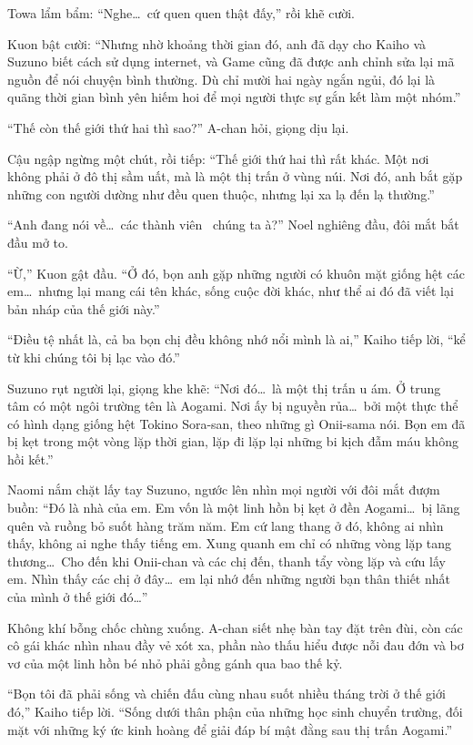 \documentclass[../main.tex]{subfiles}
\begin{document}
Towa lẩm bẩm: ``Nghe\dots\ cứ quen quen thật đấy,'' rồi khẽ cười.

Kuon bật cười: ``Nhưng nhờ khoảng thời gian đó, anh đã dạy cho Kaiho và Suzuno biết cách sử dụng internet, và Game cũng đã được anh chỉnh sửa lại mã nguồn để nói chuyện bình thường. Dù chỉ mười hai ngày ngắn ngủi, đó lại là quãng thời gian bình yên hiếm hoi để mọi người thực sự gắn kết làm một nhóm.''

``Thế còn thế giới thứ hai thì sao?'' A-chan hỏi, giọng dịu lại.

Cậu ngập ngừng một chút, rồi tiếp: ``Thế giới thứ hai thì rất khác. Một nơi không phải ở đô thị sầm uất, mà là một thị trấn ở vùng núi. Nơi đó, anh bắt gặp những con người dường như đều quen thuộc, nhưng lại xa lạ đến lạ thường.''

``Anh đang nói về\dots\ các thành viên \hll\ chúng ta à?'' Noel nghiêng đầu, đôi mắt bắt đầu mở to.

``Ừ,'' Kuon gật đầu. ``Ở đó, bọn anh gặp những người có khuôn mặt giống hệt các em\dots\ nhưng lại mang cái tên khác, sống cuộc đời khác, như thể ai đó đã viết lại bản nháp của thế giới này.''

``Điều tệ nhất là, cả ba bọn chị đều không nhớ nổi mình là ai,'' Kaiho tiếp lời, ``kể từ khi chúng tôi bị lạc vào đó.''

Suzuno rụt người lại, giọng khe khẽ: ``Nơi đó\dots\ là một thị trấn u ám. Ở trung tâm có một ngôi trường tên là Aogami. Nơi ấy bị nguyền rủa\dots\ bởi một thực thể có hình dạng giống hệt Tokino Sora-san, theo những gì Onii-sama nói. Bọn em đã bị kẹt trong một vòng lặp thời gian, lặp đi lặp lại những bi kịch đẫm máu không hồi kết.''

Naomi nắm chặt lấy tay Suzuno, ngước lên nhìn mọi người với đôi mắt đượm buồn: ``Đó là nhà của em. Em vốn là một linh hồn bị kẹt ở đền Aogami\dots\ bị lãng quên và ruồng bỏ suốt hàng trăm năm. Em cứ lang thang ở đó, không ai nhìn thấy, không ai nghe thấy tiếng em. Xung quanh em chỉ có những vòng lặp tang thương\dots\ Cho đến khi Onii-chan và các chị đến, thanh tẩy vòng lặp và cứu lấy em. Nhìn thấy các chị ở đây\dots\ em lại nhớ đến những người bạn thân thiết nhất của mình ở thế giới đó\dots''

Không khí bỗng chốc chùng xuống. A-chan siết nhẹ bàn tay đặt trên đùi, còn các cô gái khác nhìn nhau đầy vẻ xót xa, phần nào thấu hiểu được nỗi đau đớn và bơ vơ của một linh hồn bé nhỏ phải gồng gánh qua bao thế kỷ.

``Bọn tôi đã phải sống và chiến đấu cùng nhau suốt nhiều tháng trời ở thế giới đó,'' Kaiho tiếp lời. ``Sống dưới thân phận của những học sinh chuyển trường, đối mặt với những ký ức kinh hoàng để giải đáp bí mật đằng sau thị trấn Aogami.''
\end{document}
